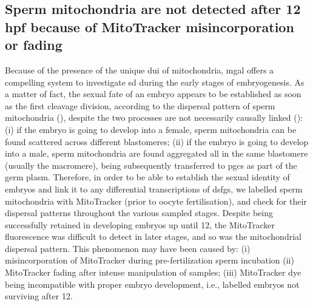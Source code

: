 \subsection{Sperm mitochondria are not detected after 12 hpf because of MitoTracker misincorporation or fading}\label{chapter:insitu-discussionMito}
Because of the presence of the unique \gls{dui} of mitochondria, \gls{mgal} offers a compelling system to investigate \gls{sd} during the early stages of embryogenesis. As a matter of fact, the sexual fate of an embryo appears to be established as soon as the first cleavage division, according to the dispersal pattern of sperm mitochondria (), despite the two processes are not necessarily causally linked (): (i) if the embryo is going to develop into a female, sperm mitochondria can be found scattered across different blastomeres; (ii) if the embryo is going to develop into a male, sperm mitochondria are found aggregated all in the same blastomere (usually the macromere), being subsequently transferred to \glspl{pgc} as part of the germ plasm. Therefore, in order to be able to establish the sexual identity of embryos and link it to any differential transcriptions of \glspl{dsfg}, we labelled sperm mitochondria with MitoTracker (prior to oocyte fertilisation), and check for their dispersal patterns throughout the various sampled stages. Despite being successfully retained in developing embryos up until \qty{12}{\hpf}, the MitoTracker fluorescence was difficult to detect in later stages, and so was the mitochondrial dispersal pattern. This phenomenon may have been caused by: (i) misincorporation of MitoTracker during pre-fertilization sperm incubation (ii) MitoTracker fading after intense manipulation of samples; (iii) MitoTracker dye being incompatible with proper embryo development, i.e., labelled embryos not surviving after \qty{12}{\hpf}.
